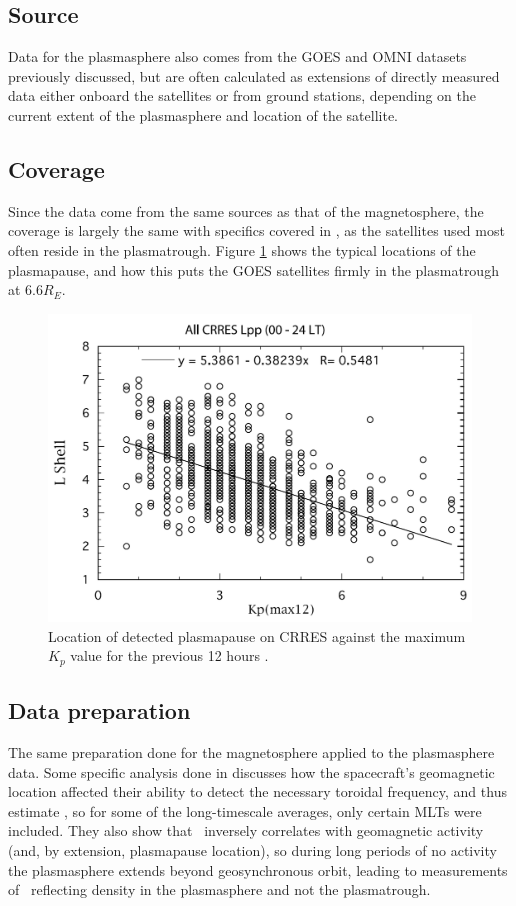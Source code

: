\subsection{Source}
Data for the plasmasphere also comes from the GOES and OMNI datasets previously discussed, but are often calculated as extensions of directly measured data either onboard the satellites or from ground stations, depending on the current extent of the plasmasphere and location of the satellite.

\subsection{Coverage}
Since the data come from the same sources as that of the magnetosphere, the coverage is largely the same with specifics covered in \cite{Takahashi2010SolarCycleVariation}, as the satellites used most often reside in the plasmatrough. Figure \ref{fig:PlasmatroughLocation} shows the typical locations of the plasmapause, and how this puts the GOES satellites firmly in the plasmatrough at 6.6$R_E$.

\begin{figure}[htp!]
	\centering
	\includegraphics[width=0.8\linewidth]{Figures/LShellPlasmapuse.png}
	\caption{Location of detected plasmapause on CRRES against the maximum $K_p$ value for the previous 12 hours \citep{Moldwin2002ModelPlasmapause}.}
	\label{fig:PlasmatroughLocation}
\end{figure}



\subsection{Data preparation}
The same preparation done for the magnetosphere applied to the plasmasphere data.  Some specific analysis done in \cite{Takahashi2010SolarCycleVariation} discusses how the spacecraft's geomagnetic location affected their ability to detect the necessary toroidal frequency, and thus estimate \req, so for some of the long-timescale averages, only certain MLTs were included. They also show that \req\ inversely correlates with geomagnetic activity (and, by extension, plasmapause location), so during long periods of no activity the plasmasphere extends beyond geosynchronous orbit, leading to measurements of \req\ reflecting density in the plasmasphere and not the plasmatrough. 

